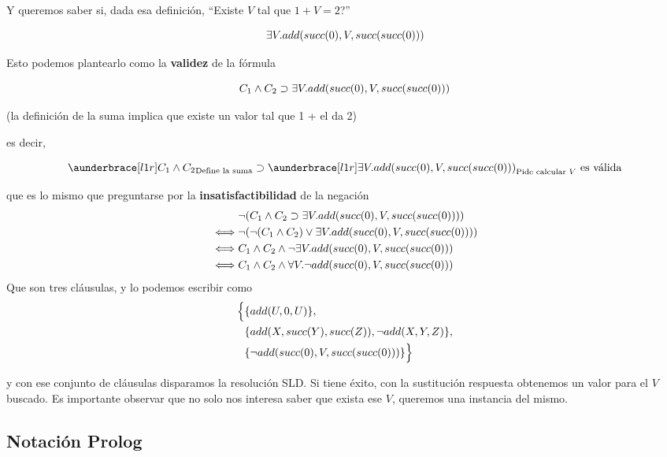 \documentclass{report}
\theoremstyle{definition} %
\begin{document}
Y queremos saber si, dada esa definición, ``Existe $V$ tal que $1 + V = 2$?''

\[
    \exists V . add(succ(0), V, succ(succ(0)))
\]

Esto podemos plantearlo como la \textbf{validez} de la fórmula

\[
    \impl{C_1 \wedge C_2}{
        \existe{V}{add(succ(0), V, succ(succ(0)))}
    }
\]

(la definición de la suma implica que existe un valor tal que 1 + el da 2)

es decir,

\[
    \impl
    {
        \ubrace{C_1 \wedge C_2}{\text{Define la suma}}
    }
    {
        \ubrace{
            \existe{V}{add(succ(0), V, succ(succ(0)))}
        }{\text{Pide calcular } V}
    } \text{ es válida}
\]

que es lo mismo que preguntarse por la \textbf{insatisfactibilidad} de la
negación
\begin{align*}
    &\neg (C_1 \wedge C_2 \supset 
        \exists V . add(succ(0), V, succ(succ(0)))
   )\\
    \iff &\neg (
        \neg (C_1 \wedge C_2) \vee \exists V . add(succ(0), V, succ(succ(0)))
    )\\
    \iff &C_1 \wedge C_2 \wedge \neg\exists V . add(succ(0), V, succ(succ(0)))\\
    \iff &C_1 \wedge C_2 \wedge
        \forall V . \neg add(succ(0), V, succ(succ(0)))
\end{align*}
Que son tres cláusulas, y lo podemos escribir como
\begin{align*}
    \Big\{
        &\{ add(U, 0, U) \},\\
        &\{ add(X, succ(Y), succ(Z)), \neg add(X, Y, Z) \},\\
        &\{ \neg add(succ(0), V, succ(succ(0))) \}
    \Big\}
\end{align*}

y con ese conjunto de cláusulas disparamos la resolución SLD. Si tiene éxito,
con la sustitución respuesta obtenemos un valor para el $V$ buscado. Es
importante observar que no solo nos interesa saber que exista ese $V$, queremos
una instancia del mismo.

\subsection{Notación Prolog}
\end{document}
